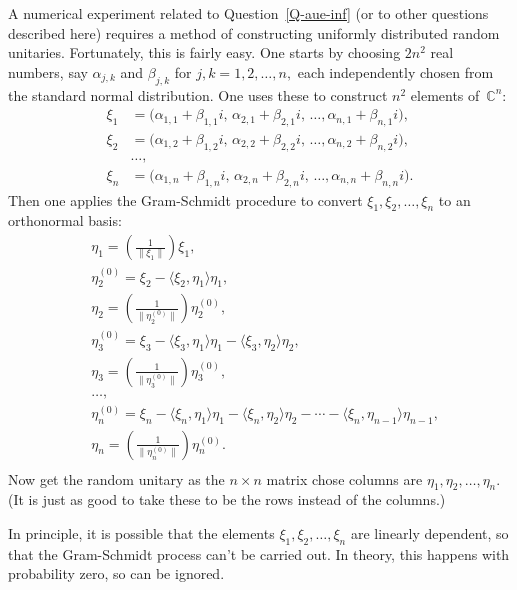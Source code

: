 \documentclass[10pt]{amsart}
\theoremstyle{definition}
\newcommand{\af}{\alpha}
\newcommand{\bt}{\beta}
\newcommand{\et}{\eta}
\newcommand{\C}{{\mathbb{C}}}
\begin{document}
A numerical experiment related to Question~\ref{Q-aue-inf}
(or to other questions described here)
requires a method of constructing
uniformly distributed random unitaries.
Fortunately,
this is fairly easy.
One starts by choosing $2 n^2$ real numbers,
say $\af_{j, k}$ and $\bt_{j, k}$ for $j, k = 1, 2, \ldots, n,$
each independently chosen from the standard normal distribution.
One uses these to construct $n^2$ elements of~$\C^n$:
\begin{align*}
\xi_1 & = \big( \af_{1, 1} + \bt_{1, 1} i, \,
              \af_{2, 1} + \bt_{2, 1} i, \, \ldots, 
              \af_{n, 1} + \bt_{n, 1} i \big),  \\
\xi_2 & = \big( \af_{1, 2} + \bt_{1, 2} i, \,
              \af_{2, 2} + \bt_{2, 2} i, \, \ldots, 
              \af_{n, 2} + \bt_{n, 2} i \big), \\
& \ldots,  \\
\xi_n & = \big( \af_{1, n} + \bt_{1, n} i, \,
              \af_{2, n} + \bt_{2, n} i, \, \ldots, 
              \af_{n, n} + \bt_{n, n} i \big).
\end{align*}
Then one applies the Gram-Schmidt procedure to convert
$\xi_1, \xi_2, \ldots, \xi_n$ to an orthonormal basis:
\begin{align*}
& \et_1 = \left( \frac{1}{\| \xi_1 \|} \right) \xi_1,  \\
& \et_2^{(0)} = \xi_2 - \langle \xi_2, \et_1 \rangle \et_1,  \\
& \et_2
 = \left( \frac{1}{\big\| \et_2^{(0)} \big\|} \right) \et_2^{(0)},  \\
& \et_3^{(0)} = \xi_3
              - \langle \xi_3, \et_1 \rangle \et_1
              - \langle \xi_3, \et_2 \rangle \et_2,  \\
& \et_3
 = \left( \frac{1}{\big\| \et_3^{(0)} \big\|} \right) \et_3^{(0)},  \\
& \ldots,  \\
& \et_n^{(0)} = \xi_n
              - \langle \xi_n, \et_1 \rangle \et_1
              - \langle \xi_n, \et_2 \rangle \et_2
              - \cdots
              - \langle \xi_n, \et_{n - 1} \rangle \et_{n - 1},  \\
& \et_n
 = \left( \frac{1}{\big\| \et_n^{(0)} \big\|} \right) \et_n^{(0)}.  \\
\end{align*}
Now get the random unitary as the $n \times n$ matrix chose columns
are $\et_1, \et_2, \ldots, \et_n.$
(It is just as good to take these to be the rows instead
of the columns.)

In principle, it is possible that the elements
$\xi_1, \xi_2, \ldots, \xi_n$ are linearly dependent,
so that the Gram-Schmidt process can't be carried out.
In theory, this happens with probability zero,
so can be ignored.
\end{document}
